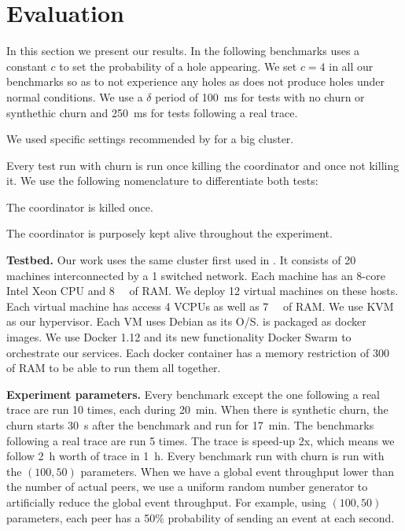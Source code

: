 
\section{Evaluation}
\label{sec:evaluation}
In this section we present our results. In the following benchmarks \epto uses a constant $c$ to set the probability of a hole appearing. We set $c = 4$ in all our benchmarks so as to not experience any holes as \jgroups does not produce holes under normal conditions. We use a $\delta$ period of \SI{100}{\milli\second} for tests with no churn or synthethic churn and \SI{250}{\milli\second} for tests following a real trace.
\par 
We used specific settings recommended by \jgroups for a big cluster.
\par
Every \jgroups test run with churn is run once killing the coordinator and once not killing it. We use the following nomenclature to differentiate both tests:
\begin{description}
	\item[\textbf{\jgroups-coord}:] The coordinator is killed once.
	\item[\textbf{\jgroups-nocoord}:] The coordinator is purposely kept alive throughout the experiment.
\end{description}
\par
\textbf{Testbed.} Our work uses the same cluster first used in \autocite{vaucher2016erasure}. It consists of 20 machines interconnected by a \SI{1}{\gbps} switched network. Each machine has an 8-core Intel Xeon CPU and \SI{8}{\giga\byte} of RAM. We deploy 12 virtual machines on these hosts. Each virtual machine has access 4 VCPUs as well as \SI{7}{\giga\byte} of RAM. We use KVM as our hypervisor. Each VM uses Debian as its O/S. \eptotester is packaged as docker images. We use Docker 1.12 and its new functionality Docker Swarm to orchestrate our services. Each docker container has a memory restriction of \SI{300}{\mega\byte} of RAM to be able to run them all together.
\par
\textbf{Experiment parameters.} Every benchmark except the one following a real trace are run 10 times, each during \SI{20}{\minute}. When there is synthetic churn, the churn starts \SI{30}{\second} after the benchmark and run for \SI{17}{\minute}. The benchmarks following a real trace are run 5 times. The trace is speed-up 2x, which means we follow \SI{2}{\hour} worth of trace in \SI{1}{\hour}. Every benchmark run with churn is run with the $(100,50)$ parameters. When we have a global event throughput lower than the number of actual peers, we use a uniform random number generator to artificially reduce the global event throughput. For example, using $(100,50)$ parameters, each peer has a 50\% probability of sending an event at each second.
